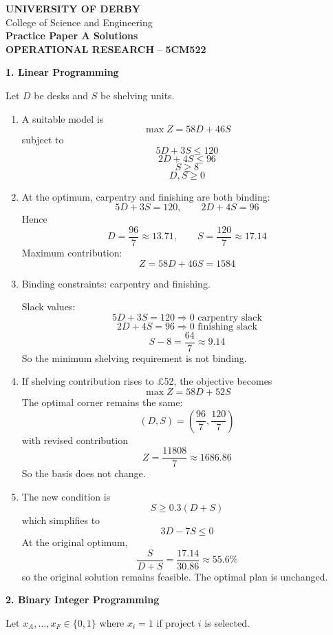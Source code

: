 \documentclass[11pt,a4paper]{article}
\newcommand{\universityname}{UNIVERSITY OF DERBY}
\newcommand{\college}{College of Science and Engineering}
\newcommand{\examtitle}{Practice Paper A Solutions}
\newcommand{\moduletitle}{OPERATIONAL RESEARCH}
\newcommand{\modulecode}{5CM522}
\begin{document}
\begin{center}
{\large \textbf{\universityname}}\\
{\college}\\[0.4em]
{\Large \textbf{\examtitle}}\\
{\large \textbf{\moduletitle} -- \textbf{\modulecode}}
\end{center}

\textbf{1. Linear Programming}

Let $D$ be desks and $S$ be shelving units.

\begin{enumerate}
\item A suitable model is
\[
\max Z = 58D + 46S
\]
subject to
\[
5D + 3S \le 120
\]
\[
2D + 4S \le 96
\]
\[
S \ge 8
\]
\[
D,S \ge 0
\]

\item At the optimum, carpentry and finishing are both binding:
\[
5D+3S=120,\qquad 2D+4S=96
\]
Hence
\[
D=\frac{96}{7}\approx 13.71,\qquad S=\frac{120}{7}\approx 17.14
\]
Maximum contribution:
\[
Z=58D+46S=1584
\]

\item Binding constraints: carpentry and finishing.

Slack values:
\[
5D+3S=120 \Rightarrow 0 \text{ carpentry slack}
\]
\[
2D+4S=96 \Rightarrow 0 \text{ finishing slack}
\]
\[
S-8=\frac{64}{7}\approx 9.14
\]
So the minimum shelving requirement is not binding.

\item If shelving contribution rises to \pounds52, the objective becomes
\[
\max Z=58D+52S
\]
The optimal corner remains the same:
\[
\left(D,S\right)=\left(\frac{96}{7},\frac{120}{7}\right)
\]
with revised contribution
\[
Z=\frac{11808}{7}\approx 1686.86
\]
So the basis does not change.

\item The new condition is
\[
S \ge 0.3(D+S)
\]
which simplifies to
\[
3D-7S \le 0
\]
At the original optimum,
\[
\frac{S}{D+S}=\frac{17.14}{30.86}\approx 55.6\%
\]
so the original solution remains feasible. The optimal plan is unchanged.
\end{enumerate}

\textbf{2. Binary Integer Programming}

Let $x_A,\ldots,x_F \in \{0,1\}$ where $x_i=1$ if project $i$ is selected.
\end{document}
